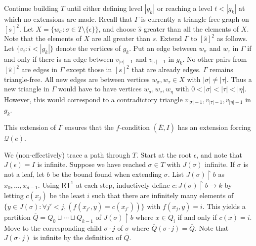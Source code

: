 \documentclass{article}
\def\Q{\mathcal{Q}}
\def\Q{\mathcal{Q}}
\newcommand{\uh}{\upharpoonright}
\newcommand{\ol}[1]{\overline{#1}}
\numberwithin{theorem}{section}
\begin{document}
Continue building $T$ until either defining level $|g_k|$ or reaching a level $t < |g_k|$ at which no extensions are made.  Recall that $\Gamma$ is currently a triangle-free graph on $[s]^2$.  Let $X = \{w_\sigma : \sigma \in T \setminus \{\epsilon\}\}$, and choose $\hat{s}$ greater than all the elements of $X$.  Note that the elements of $X$ are all greater than $s$.  Extend $\Gamma$ to $[\hat{s}]^2$ as follows.  Let $\{v_i : i < |g_k|\}$ denote the vertices of $g_k$.  Put an edge between $w_{\sigma}$ and $w_{\tau}$ in $\Gamma$ if and only if there is an edge between $v_{|\sigma|-1}$ and $v_{|\tau|-1}$ in $g_k$.  No other pairs from $[\hat{s}]^2$ are edges in $\Gamma$ except those in $[s]^2$ that are already edges.  $\Gamma$ remains triangle-free.  All new edges are between vertices $w_\sigma, w_\tau \in X$ with $|\sigma| \neq |\tau|$.  Thus a new triangle in $\Gamma$ would have to have vertices $w_\sigma, w_\tau, w_\eta$ with $0 < |\sigma| < |\tau| < |\eta|$.  However, this would correspond to a contradictory triangle $v_{|\sigma|-1}, v_{|\tau|-1}, v_{|\eta|-1}$ in $g_k$.

This extension of $\Gamma$ ensures that the $f$-condition $(\ol{E}, I)$ has an extension forcing $\Q(\ol{e})$.

We (non-effectively) trace a path through $T$.  Start at the root $\epsilon$, and note that $J(\epsilon) = I$ is infinite.  Suppose we have reached $\sigma \in T$ with $J(\sigma)$ infinite.  If $\sigma$ is not a leaf, let $b$ be the bound found when extending $\sigma$.  List $J(\sigma) \uh b$ as $x_0, \dots, x_{d-1}$.  Using $\mathsf{RT}^1$ at each step, inductively define $c : J(\sigma) \uh b \to k$ by letting $c(x_j)$ be the least $i$ such that there are infinitely many elements of $\{y \in J(\sigma) : \forall j' < j, (f(x_{j'}, y) = c(x_{j'}))\}$ with $f(x_j, y) = i$.  This yields a partition $\ol{Q} = Q_0 \sqcup \cdots \sqcup Q_{k-1}$ of $J(\sigma) \uh b$ where $x \in Q_i$ if and only if $c(x) = i$.  Move to the corresponding child $\sigma \cdot j$ of $\sigma$ where $\ol{Q}(\sigma \cdot j) = \ol{Q}$.  Note that $J(\sigma \cdot j)$ is infinite by the definition of $\ol{Q}$.  
\end{document}
